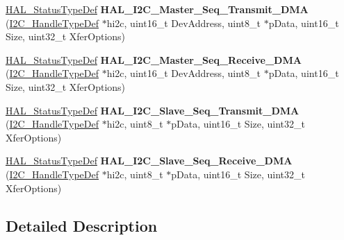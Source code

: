 \begin{DoxyCompactItemize}
\mbox{\hyperlink{stm32f7xx__hal__def_8h_a63c0679d1cb8b8c684fbb0632743478f}{H\+A\+L\+\_\+\+Status\+Type\+Def}} {\bfseries H\+A\+L\+\_\+\+I2\+C\+\_\+\+Master\+\_\+\+Seq\+\_\+\+Transmit\+\_\+\+D\+MA} (\mbox{\hyperlink{struct_____i2_c___handle_type_def}{I2\+C\+\_\+\+Handle\+Type\+Def}} $\ast$hi2c, uint16\+\_\+t Dev\+Address, uint8\+\_\+t $\ast$p\+Data, uint16\+\_\+t Size, uint32\+\_\+t Xfer\+Options)
\item 
\mbox{\label{group___i2_c___exported___functions___group2_ga83c1c311ce7822081cfca9aeef9ad632}} 
\mbox{\hyperlink{stm32f7xx__hal__def_8h_a63c0679d1cb8b8c684fbb0632743478f}{H\+A\+L\+\_\+\+Status\+Type\+Def}} {\bfseries H\+A\+L\+\_\+\+I2\+C\+\_\+\+Master\+\_\+\+Seq\+\_\+\+Receive\+\_\+\+D\+MA} (\mbox{\hyperlink{struct_____i2_c___handle_type_def}{I2\+C\+\_\+\+Handle\+Type\+Def}} $\ast$hi2c, uint16\+\_\+t Dev\+Address, uint8\+\_\+t $\ast$p\+Data, uint16\+\_\+t Size, uint32\+\_\+t Xfer\+Options)
\item 
\mbox{\label{group___i2_c___exported___functions___group2_ga105b8f6d6d7310e2d9bc170e8ed412ae}} 
\mbox{\hyperlink{stm32f7xx__hal__def_8h_a63c0679d1cb8b8c684fbb0632743478f}{H\+A\+L\+\_\+\+Status\+Type\+Def}} {\bfseries H\+A\+L\+\_\+\+I2\+C\+\_\+\+Slave\+\_\+\+Seq\+\_\+\+Transmit\+\_\+\+D\+MA} (\mbox{\hyperlink{struct_____i2_c___handle_type_def}{I2\+C\+\_\+\+Handle\+Type\+Def}} $\ast$hi2c, uint8\+\_\+t $\ast$p\+Data, uint16\+\_\+t Size, uint32\+\_\+t Xfer\+Options)
\item 
\mbox{\label{group___i2_c___exported___functions___group2_gaeb0f79e15c8dab0d370b3fb48ca592b7}} 
\mbox{\hyperlink{stm32f7xx__hal__def_8h_a63c0679d1cb8b8c684fbb0632743478f}{H\+A\+L\+\_\+\+Status\+Type\+Def}} {\bfseries H\+A\+L\+\_\+\+I2\+C\+\_\+\+Slave\+\_\+\+Seq\+\_\+\+Receive\+\_\+\+D\+MA} (\mbox{\hyperlink{struct_____i2_c___handle_type_def}{I2\+C\+\_\+\+Handle\+Type\+Def}} $\ast$hi2c, uint8\+\_\+t $\ast$p\+Data, uint16\+\_\+t Size, uint32\+\_\+t Xfer\+Options)
\end{DoxyCompactItemize}


\subsection{Detailed Description}
